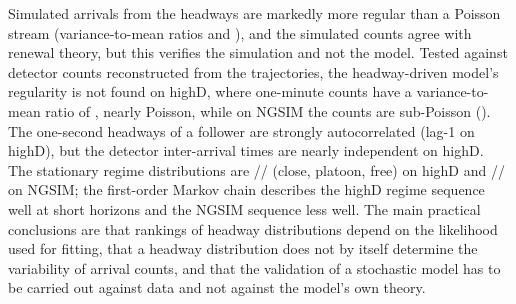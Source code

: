 \documentclass[11pt,a4paper]{article}
\numberwithin{equation}{section}
\begin{document}
Simulated arrivals from the headways are markedly more regular than a Poisson stream (variance-to-mean ratios \hdCV{} and \ngCV), and the simulated counts agree with renewal theory, but this verifies the simulation and not the model. Tested against detector counts reconstructed from the trajectories, the headway-driven model's regularity
is not found on highD, where one-minute counts have a variance-to-mean ratio of \hdDetFanoObs, nearly Poisson, while on NGSIM the counts are sub-Poisson (\ngDetFanoObs). The one-second headways of a follower are strongly autocorrelated (lag-1 \hdLagOne{} on highD), but the detector inter-arrival times are nearly independent on highD.
The stationary regime distributions are \hdPiC/\hdPiP/\hdPiF{} (close, platoon, free) on highD and \ngPiC/\ngPiP/\ngPiF{} on NGSIM; the first-order Markov chain describes the highD regime sequence well at short horizons and the NGSIM sequence less well.
The main practical conclusions are that rankings of headway distributions depend on the likelihood used for fitting, that a headway distribution does not by itself determine the variability of arrival counts, and that the validation of a stochastic model has to be carried out against data and not against the model's own theory.




\clearpage
\appendix

\end{document}
